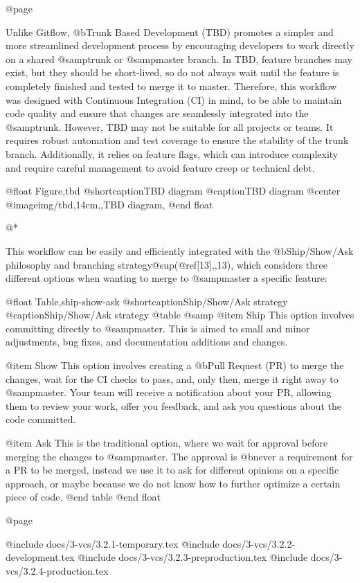 @page

Unlike Gitflow, @b{Trunk Based Development (TBD)} promotes a simpler and more streamlined development process by encouraging developers to work directly on a shared @samp{trunk} or @samp{master} branch. In TBD, feature branches may exist, but they should be short-lived, so do not always wait until the feature is completely finished and tested to merge it to master. Therefore, this workflow was designed with Continuous Integration (CI) in mind, to be able to maintain code quality and ensure that changes are seamlessly integrated into the @samp{trunk}. However, TBD may not be suitable for all projects or teams. It requires robust automation and test coverage to ensure the stability of the trunk branch. Additionally, it relies on feature flags, which can introduce complexity and require careful management to avoid feature creep or technical debt.

@float Figure,tbd
@shortcaption{TBD diagram}
@caption{TBD diagram}
@center @image{img/tbd,14cm,,TBD diagram,}
@end float

@*

This workflow can be easily and efficiently integrated with the @b{Ship/Show/Ask} philosophy and branching strategy@sup{(@ref{[13],,13})}, which considers three different options when wanting to merge to @samp{master} a specific feature:

@float Table,ship-show-ask
@shortcaption{Ship/Show/Ask strategy}
@caption{Ship/Show/Ask strategy}
@table @samp
@item Ship
This option involves committing directly to @samp{master}. This is aimed to small and minor adjustments, bug fixes, and documentation additions and changes.

@item Show
This option involves creating a @b{Pull Request (PR)} to merge the changes, wait for the CI checks to pass, and, only then, merge it right away to @samp{master}. Your team will receive a notification about your PR, allowing them to review your work, offer you feedback, and ask you questions about the code committed.

@item Ask
This is the traditional option, where we wait for approval before merging the changes to @samp{master}. The approval is @b{never} a requirement for a PR to be merged, instead we use it to ask for different opinions on a specific approach, or maybe because we do not know how to further optimize a certain piece of code.
@end table
@end float

@page

@include docs/3-vcs/3.2.1-temporary.tex
@include docs/3-vcs/3.2.2-development.tex
@include docs/3-vcs/3.2.3-preproduction.tex
@include docs/3-vcs/3.2.4-production.tex
